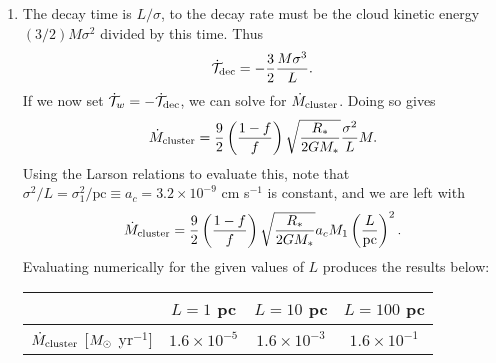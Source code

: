 \begin{enumerate}
\begin{enumerate}
\item The decay time is $L/\sigma$, to the decay rate must be the cloud kinetic energy $(3/2) M \sigma^2$ divided by this time. Thus
\begin{displaymath}
\dot{\mathcal{T}}_{\rm dec} = -\frac{3}{2} \frac{M \sigma^3}{L}.
\end{displaymath}
If we now set $\dot{\mathcal{T}}_w = -\dot{\mathcal{T}}_{\rm dec}$, we can solve for $\dot{M}_{\rm cluster}$. Doing so gives
\begin{displaymath}
\dot{M}_{\rm cluster} = \frac{9}{2}\left(\frac{1-f}{f}\right) \sqrt{\frac{R_*}{2 G M_*}} \frac{\sigma^2}{L} M.
\end{displaymath}
Using the Larson relations to evaluate this, note that $\sigma^2/L = \sigma_1^2/\mbox{pc} \equiv a_c = 3.2\times 10^{-9}$ cm s$^{-1}$ is constant, and we are left with
\begin{displaymath}
\dot{M}_{\rm cluster} = \frac{9}{2}\left(\frac{1-f}{f}\right) \sqrt{\frac{R_*}{2 G M_*}} a_c M_1 \left(\frac{L}{\mbox{pc}}\right)^2.
\end{displaymath}
Evaluating numerically for the given values of $L$ produces the results below:
\begin{center}
\begin{tabular}{l|ccc}
& $L=1$ pc & $L = 10$ pc & $L = 100$ pc \\ \hline
$\dot{M}_{\rm cluster}$ [$M_{\odot}$ yr$^{-1}$] & $1.6\times 10^{-5}$ & $1.6\times 10^{-3}$ & $1.6\times 10^{-1}$
\end{tabular}
\end{center}


\end{enumerate}
\end{enumerate}
